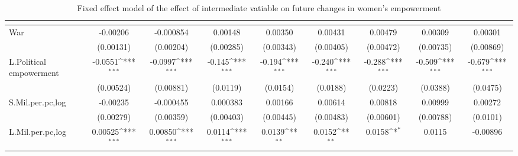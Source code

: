 \begin{table}[htbp]\centering
\def\sym#1{\ifmmode^{#1}\else\(^{#1}\)\fi}
\caption{Fixed effect model of the effect of intermediate vatiable on future changes in women's empowerment\label{intermpolempowerment}}
\begin{tabular}{l*{8}{c}}
\hline\hline
                    &&&&&&&&\\
\hline
War                 &    -0.00206         &   -0.000854         &     0.00148         &     0.00350         &     0.00431         &     0.00479         &     0.00309         &     0.00301         \\
                    &   (0.00131)         &   (0.00204)         &   (0.00285)         &   (0.00343)         &   (0.00405)         &   (0.00472)         &   (0.00735)         &   (0.00869)         \\
[1em]
L.Political empowerment&     -0.0551\sym{***}&     -0.0997\sym{***}&      -0.145\sym{***}&      -0.194\sym{***}&      -0.240\sym{***}&      -0.288\sym{***}&      -0.509\sym{***}&      -0.679\sym{***}\\
                    &   (0.00524)         &   (0.00881)         &    (0.0119)         &    (0.0154)         &    (0.0188)         &    (0.0223)         &    (0.0388)         &    (0.0475)         \\
[1em]
S.Mil.per.pc,log    &    -0.00235         &   -0.000455         &    0.000383         &     0.00166         &     0.00614         &     0.00818         &     0.00999         &     0.00272         \\
                    &   (0.00279)         &   (0.00359)         &   (0.00403)         &   (0.00445)         &   (0.00483)         &   (0.00601)         &   (0.00788)         &    (0.0101)         \\
[1em]
L.Mil.per.pc,log    &     0.00525\sym{***}&     0.00850\sym{***}&      0.0114\sym{***}&      0.0139\sym{**} &      0.0152\sym{**} &      0.0158\sym{*}  &      0.0115         &    -0.00896         \\

\end{tabular}
\end{table}
